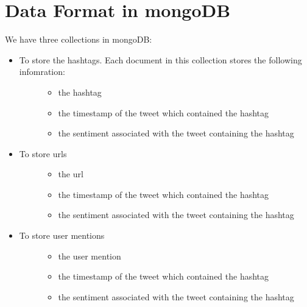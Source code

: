 \documentclass[letterpaper,10pt,english]{sphinxmanual}
\begin{document}
\section{Data Format in mongoDB}
\label{\detokenize{mongoDB_data_ingestion:data-format-in-mongodb}}
We have three collections in mongoDB:
\begin{itemize}
\item {} \begin{description}
\item[{To store the hashtags. Each document in this collection stores the following infomration:}] \leavevmode\begin{itemize}
\item {} 
the hashtag

\item {} 
the timestamp of the tweet which contained the hashtag

\item {} 
the sentiment associated with the tweet containing the hashtag

\end{itemize}

\end{description}

\item {} \begin{description}
\item[{To store urls}] \leavevmode\begin{itemize}
\item {} 
the url

\item {} 
the timestamp of the tweet which contained the hashtag

\item {} 
the sentiment associated with the tweet containing the hashtag

\end{itemize}

\end{description}

\item {} \begin{description}
\item[{To store user mentions}] \leavevmode\begin{itemize}
\item {} 
the user mention

\item {} 
the timestamp of the tweet which contained the hashtag

\item {} 
the sentiment associated with the tweet containing the hashtag

\end{itemize}

\end{description}

\end{itemize}
\end{document}
